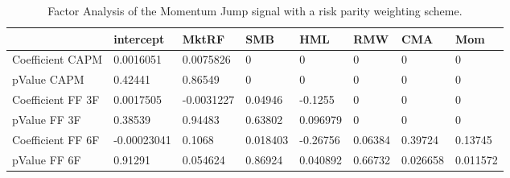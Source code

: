 \begin{table}[H]
\centering
\begin{tabular}{llllllll}
\hline& intercept & MktRF & SMB & HML & RMW & CMA & Mom \\ 
\hline 
Coefficient CAPM & 0.0016051 & 0.0075826 & 0 & 0 & 0 & 0 & 0 \\ 
pValue CAPM & 0.42441 & 0.86549 & 0 & 0 & 0 & 0 & 0 \\ 
Coefficient FF 3F & 0.0017505 & -0.0031227 & 0.04946 & -0.1255 & 0 & 0 & 0 \\ 
pValue FF 3F & 0.38539 & 0.94483 & 0.63802 & 0.096979 & 0 & 0 & 0 \\ 
Coefficient FF 6F & -0.00023041 & 0.1068 & 0.018403 & -0.26756 & 0.06384 & 0.39724 & 0.13745 \\ 
pValue FF 6F & 0.91291 & 0.054624 & 0.86924 & 0.040892 & 0.66732 & 0.026658 & 0.011572 \\ 
\hline
\end{tabular}
\caption{Factor Analysis of the Momentum Jump signal with a risk parity weighting scheme.}
\label{MOMJUMPRP_FACTOR}
\end{table}